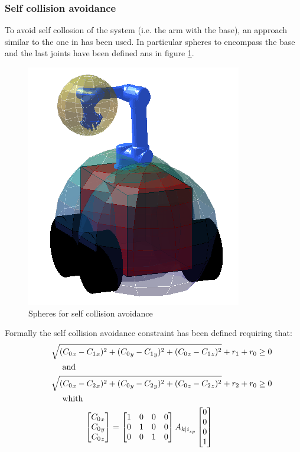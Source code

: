 \subsubsection*{Self collision avoidance}
	To avoid self collosion of the system (i.e. the arm with the base), an approach similar to the one in \cite{sandberg1988collision} has been used. In particular spheres to encompass the base and the last joints have been defined ans in figure \ref{spheres_3d}.
	\begin{figure}[h!]
	\centering
	\includegraphics[scale=0.4]{IMMAGINI/spheres_3d.png}
	\caption{Spheres for self collision avoidance}
	\label{spheres_3d}	
	\end{figure}
	Formally the self collision avoidance constraint has been defined requiring that: 
	\begin{equation}
	\begin{split} 
		&\sqrt{({C_0}_x-{C_1}_x)^2+({C_0}_y-{C_1}_y)^2+({C_0}_z-{C_1}_z)^2} + r_1 +r_0 \geq 0 \\
		&\ \ \ \ \textnormal{and} \\
		&\sqrt{({C_0}_x-{C_2}_x)^2+({C_0}_y-{C_2}_y)^2+({C_0}_z-{C_2}_z)^2} + r_2 +r_0 \geq 0 \\
		&\ \ \ \ \textnormal{whith} \\
		\ \ \ \ \ \ & \ \ \ \ \ \ \  \ \ \ \ \ \left[ \begin{matrix}
		{C_0}_x \\ {C_0}_y \\ {C_0}_z
		\end{matrix} \right]=\left[ \begin{matrix}
		1 & 0 & 0 & 0 \\ 0 & 1 & 0 & 0 \\ 0 & 0 & 1 & 0
		\end{matrix} \right]A_{{k|i}_{sp}}\left[ \begin{matrix}
		0 \\ 0 \\ 0 \\ 1\end{matrix} \right]
	\end{split}
	\label{spheres_const}
	\end{equation}
